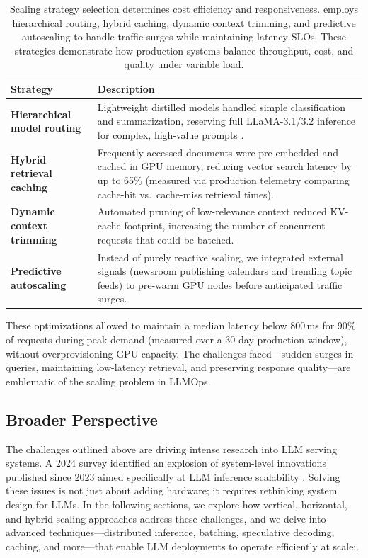 \begin{table}[t]
\centering
\small
\caption{Scaling strategy selection determines cost efficiency and responsiveness. \ishtar{} employs hierarchical routing, hybrid caching, dynamic context trimming, and predictive autoscaling to handle traffic surges while maintaining latency SLOs. These strategies demonstrate how production systems balance throughput, cost, and quality under variable load.}
\label{tab:ch06_ishtar_scaling_strategies}
\setlength{\tabcolsep}{6pt}
\renewcommand{\arraystretch}{1.3}
\begin{tabularx}{\linewidth}{@{}p{4.2cm}X@{}}
\toprule
\rowcolor{gray!15}
\textbf{Strategy} & \textbf{Description} \\
\midrule
\textbf{Hierarchical model routing} & Lightweight distilled models handled simple classification and summarization, reserving full LLaMA-3.1/3.2 inference for complex, high-value prompts \cite{frugalgpt_2023}. \\
\textbf{Hybrid retrieval caching} & Frequently accessed documents were pre-embedded and cached in GPU memory, reducing vector search latency by up to 65\% (measured via production telemetry comparing cache-hit vs.\ cache-miss retrieval times). \\
\textbf{Dynamic context trimming} & Automated pruning of low-relevance context reduced KV-cache footprint, increasing the number of concurrent requests that could be batched. \\
\textbf{Predictive autoscaling} & Instead of purely reactive scaling, we integrated external signals (newsroom publishing calendars and trending topic feeds) to pre-warm GPU nodes before anticipated traffic surges. \\
\bottomrule
\end{tabularx}
\end{table}

These optimizations allowed \ishtar{} to maintain a median latency below 800\,ms for 90\% of requests during peak demand (measured over a 30-day production window), without overprovisioning GPU capacity. The challenges faced—sudden surges in queries, maintaining low-latency retrieval, and preserving response quality—are emblematic of the scaling problem in LLMOps.

\subsection{Broader Perspective}\label{sec:scaling-broader-perspective}
The challenges outlined above are driving intense research into LLM serving systems. A 2024 survey identified an explosion of system-level innovations published since 2023 aimed specifically at LLM inference scalability \cite{Kwon2023vLLM}. Solving these issues is not just about adding hardware; it requires rethinking system design for LLMs. In the following sections, we explore how vertical, horizontal, and hybrid scaling approaches address these challenges, and we delve into advanced techniques—distributed inference, batching, speculative decoding, caching, and more—that enable LLM deployments to operate efficiently at scale:\cite{vllm_pagedattention,tensorrt_llm_docs,tgi_docs}.


